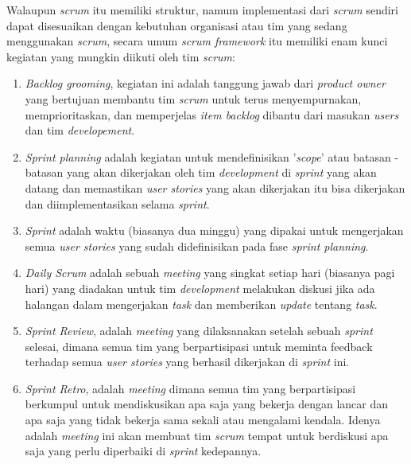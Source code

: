 \documentclass[a4paper]{article}
\begin{document}
Walaupun \textit{scrum} itu memiliki struktur, namum implementasi dari \textit{scrum} sendiri dapat disesuaikan dengan kebutuhan organisasi atau tim yang sedang menggunakan \textit{scrum}, secara umum \textit{scrum framework} itu memiliki enam kunci kegiatan yang mungkin diikuti oleh tim \textit{scrum}:
\begin{enumerate}
    \item \textit{Backlog grooming}, kegiatan ini adalah tanggung jawab dari \textit{product owner} yang bertujuan membantu tim \textit{scrum} untuk terus menyempurnakan, memprioritaskan, dan memperjelas \textit{item backlog} dibantu dari masukan \textit{users} dan tim \textit{developement}.

    \item \textit{Sprint planning} adalah kegiatan untuk mendefinisikan '\textit{scope}' atau batasan - batasan yang akan dikerjakan oleh tim \textit{development} di \textit{sprint} yang akan datang dan memastikan \textit{user stories} yang akan dikerjakan itu bisa dikerjakan dan diimplementasikan selama \textit{sprint}.

    \item \textit{Sprint} adalah waktu (biasanya dua minggu) yang dipakai untuk mengerjakan semua \textit{user stories} yang sudah didefinisikan pada fase \textit{sprint planning}. 

    \item \textit{Daily Scrum} adalah sebuah \textit{meeting} yang singkat setiap hari (biasanya pagi hari) yang diadakan untuk tim \textit{development} melakukan diskusi jika ada halangan dalam mengerjakan \textit{task} dan memberikan \textit{update} tentang \textit{task}.

    \item \textit{Sprint Review}, adalah \textit{meeting} yang dilaksanakan setelah sebuah \textit{sprint} selesai, dimana semua tim yang berpartisipasi untuk meminta feedback terhadap semua \textit{user stories} yang berhasil dikerjakan di \textit{sprint} ini.

    \item \textit{Sprint Retro}, adalah \textit{meeting} dimana semua tim yang berpartisipasi berkumpul untuk mendiskusikan apa saja yang bekerja dengan lancar dan apa saja yang tidak bekerja sama sekali atau mengalami kendala. Idenya adalah \textit{meeting} ini akan membuat tim \textit{scrum} tempat untuk berdiskusi apa saja yang perlu diperbaiki di \textit{sprint} kedepannya.
\end{enumerate}
\end{document}
